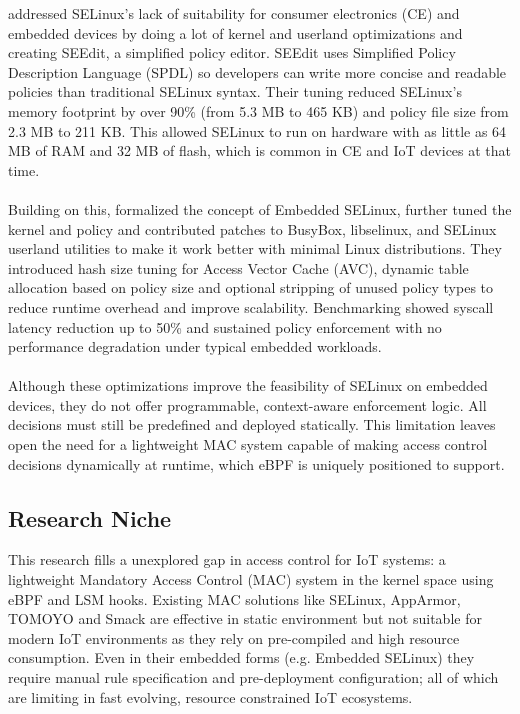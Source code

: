 \cite{SELinux_for_consumer_electronics_devices} addressed SELinux’s lack of suitability for consumer electronics (CE) and embedded devices by doing a lot of kernel and userland optimizations and creating SEEdit, a simplified policy editor. SEEdit uses Simplified Policy Description Language (SPDL) so developers can write more concise and readable policies than traditional SELinux syntax. Their tuning reduced SELinux’s memory footprint by over 90\% (from 5.3 MB to 465 KB) and policy file size from 2.3 MB to 211 KB. This allowed SELinux to run on hardware with as little as 64 MB of RAM and 32 MB of flash, which is common in CE and IoT devices at that time.
\\\\
Building on this, \cite{Reducing_Resource_Consumption_of_SELinux_for_Embedded_Systems} formalized the concept of Embedded SELinux, further tuned the kernel and policy and contributed patches to BusyBox, libselinux, and SELinux userland utilities to make it work better with minimal Linux distributions. They introduced hash size tuning for Access Vector Cache (AVC), dynamic table allocation based on policy size and optional stripping of unused policy types to reduce runtime overhead and improve scalability. Benchmarking showed syscall latency reduction up to 50\% and sustained policy enforcement with no performance degradation under typical embedded workloads.
\\\\
Although these optimizations improve the feasibility of SELinux on embedded devices, they do not offer programmable, context-aware enforcement logic. All decisions must still be predefined and deployed statically. This limitation leaves open the need for a lightweight MAC system capable of making access control decisions dynamically at runtime, which eBPF is uniquely positioned to support.

\subsection{Research Niche}

This research fills a unexplored gap in access control for IoT systems: a lightweight Mandatory Access Control (MAC) system in the kernel space using eBPF and LSM hooks. Existing MAC solutions like SELinux, AppArmor, TOMOYO and Smack are effective in static environment but not suitable for modern IoT environments as they rely on pre-compiled and high resource consumption. Even in their embedded forms (e.g. Embedded SELinux) they require manual rule specification and pre-deployment configuration; all of which are limiting in fast evolving, resource constrained IoT ecosystems.


